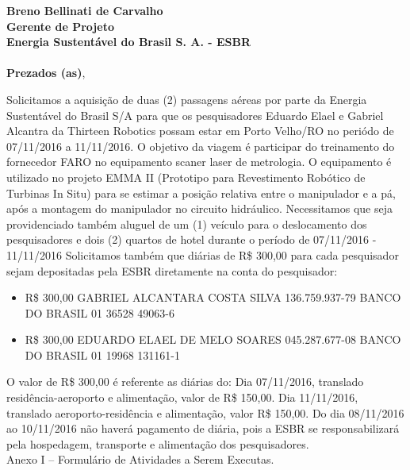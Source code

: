 \documentclass[12pt,a4paper,roman]{moderncv} %
\begin{document}
\makecvtitle \textbf{Breno Bellinati de Carvalho\\
Gerente de Projeto\\
Energia Sustent\'avel do Brasil S. A. - ESBR}\hfill\\
\vspace{2mm}\\
\textbf{Prezados (as)},\hfill\\
\vspace{0.5mm}

Solicitamos a aquisição de duas (2) passagens aéreas por parte da Energia Sustentável do Brasil S/A
para que os pesquisadores Eduardo Elael e Gabriel Alcantra da Thirteen Robotics possam estar em Porto Velho/RO no periódo de 07/11/2016 a 11/11/2016. O objetivo da viagem é participar do treinamento do fornecedor FARO no equipamento scaner laser de metrologia. O equipamento é utilizado no projeto EMMA II  (Prototipo para Revestimento Robótico de Turbinas In Situ) para se estimar a posição relativa entre o manipulador e a pá, após a montagem do manipulador no circuito hidráulico. 
Necessitamos que seja providenciado também aluguel de um (1) veículo para o deslocamento dos pesquisadores e dois (2) quartos de hotel durante o período de 07/11/2016 - 11/11/2016 
Solicitamos também que diárias de R\$ 300,00 para cada pesquisador sejam depositadas pela ESBR diretamente na conta do pesquisador: \\


\begin{itemize}  
\item R\$ 300,00 GABRIEL ALCANTARA COSTA SILVA	136.759.937-79	BANCO DO BRASIL 01	36528	49063-6 
\item R\$ 300,00 EDUARDO ELAEL DE MELO SOARES	045.287.677-08	BANCO DO BRASIL 01	19968	131161-1
\end{itemize}

\bigskip
 O valor de R\$ 300,00 é referente as diárias do: Dia 07/11/2016, translado residência-aeroporto e alimentação, valor de R\$ 150,00. Dia 11/11/2016, translado aeroporto-residência e alimentação, valor R\$ 150,00. Do dia 08/11/2016 ao 10/11/2016 não haverá pagamento de diária, pois a ESBR se responsabilizará pela hospedagem, transporte e alimentação dos pesquisadores. \\


Anexo I – Formulário de Atividades a Serem Executas.
\end{document}
